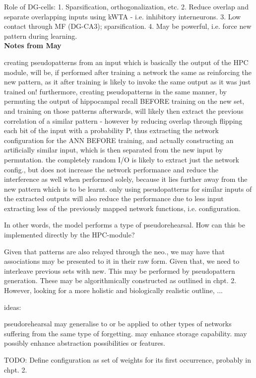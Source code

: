 Role of DG-cells: 
1. Sparsification, orthogonalization, etc.
2. Reduce overlap and separate overlapping inputs using kWTA - i.e. inhibitory interneurons.
3. Low contact through MF (DG-CA3); sparsification.
4. May be powerful, i.e. force new pattern during learning.
\citep{Rolls1998chpt6}
\\

\textbf{Notes from May}

creating pseudopatterns from an input which is basically the output of the HPC module, will be, if performed after training a network the same as reinforcing the new pattern, as it after training is likely to invoke the same output as it was just trained on!
furthermore, creating pseudopatterns in the same manner, by permuting the output of hippocampal recall BEFORE training on the new set, and training on those patterns afterwards, will likely then extract the previous correlation of a similar pattern - however by reducing overlap through flipping each bit of the input with a probability P, thus extracting the network configuration for the ANN BEFORE training, and actually constructing an artificially similar input, which is then separated from the new input by permutation. the completely random I/O is likely to extract just the network config., but does not increase the network performance and reduce the interference as well when performed solely, because it lies further away from the new pattern which is to be learnt. only using pseudopatterns for similar inputs of the extracted outputs will also reduce the performance due to less input extracting less of the previously mapped network functions, i.e. configuration.

In other words, the model performs a type of pseudorehearsal. How can this be implemented directly by the HPC-module?

Given that patterns are also relayed through the neo., we may have that associations may be presented to it in their raw form. Given that, we need to interleave previous sets with new. This may be performed by pseudopattern generation. These may be algorithmically constructed as outlined in chpt. 2. However, looking for a more holistic and biologically realistic outline, ...

ideas: 

pseudorehearsal may generalise to or be applied to other types of networks suffering from the same type of forgetting. may enhance storage capability. may possibly enhance abstraction possibilities or features.

TODO: Define configuration as set of weights for its first occurrence, probably in chpt. 2.

